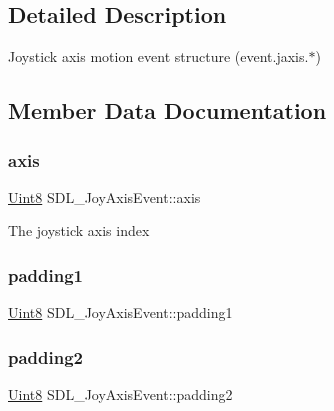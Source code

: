 \subsection{Detailed Description}
Joystick axis motion event structure (event.\+jaxis.$\ast$) 

\subsection{Member Data Documentation}
\mbox{\label{struct_s_d_l___joy_axis_event_a0beac2fb161e45771c424bd0b6daeabb}} 
\subsubsection{\texorpdfstring{axis}{axis}}
{\footnotesize\ttfamily \hyperlink{_s_d_l__stdinc_8h_a2944638813a090aa23e62f4da842c3e2}{Uint8} S\+D\+L\+\_\+\+Joy\+Axis\+Event\+::axis}

The joystick axis index \mbox{\label{struct_s_d_l___joy_axis_event_ae8e17bced478530638982f0382a0dafa}} 
\subsubsection{\texorpdfstring{padding1}{padding1}}
{\footnotesize\ttfamily \hyperlink{_s_d_l__stdinc_8h_a2944638813a090aa23e62f4da842c3e2}{Uint8} S\+D\+L\+\_\+\+Joy\+Axis\+Event\+::padding1}

\mbox{\label{struct_s_d_l___joy_axis_event_ad5407250032f618fde7437ac5f229257}} 
\subsubsection{\texorpdfstring{padding2}{padding2}}
{\footnotesize\ttfamily \hyperlink{_s_d_l__stdinc_8h_a2944638813a090aa23e62f4da842c3e2}{Uint8} S\+D\+L\+\_\+\+Joy\+Axis\+Event\+::padding2}

